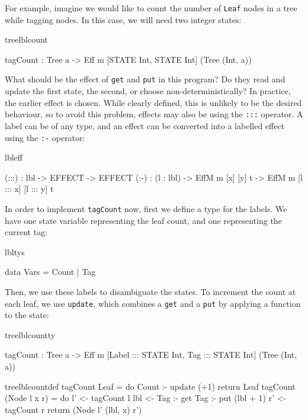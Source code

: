 For example, imagine we would like to count the number of \texttt{Leaf} nodes
in a tree while tagging nodes.  In this case, we will need two integer states:

\begin{SaveVerbatim}{treelblcount}

tagCount : Tree a -> 
     Eff m [STATE Int, STATE Int] (Tree (Int, a))

\end{SaveVerbatim}

\noindent
What should be the effect of \texttt{get} and \texttt{put} in this program?
Do they read and update the first state, the second, or choose
non-deterministically? 
%
In practice, the earlier effect is chosen. While clearly defined, this is
unlikely to be the desired behaviour, so 
to avoid this problem, effects may also be  using the
\texttt{:::} operator.  A label can be of any type, and an
effect can be converted into a labelled effect using the \texttt{:-}
operator:

\begin{SaveVerbatim}{lbleff}

(:::) : lbl -> EFFECT -> EFFECT
(:-)  : (l : lbl) -> EffM m [x] [y] t -> 
                     EffM m [l ::: x] [l ::: y] t

\end{SaveVerbatim}

\noindent
In order to implement \texttt{tagCount} now, first we define a type for the
labels. We have one state variable representing the leaf count, and one
representing the current tag:

\begin{SaveVerbatim}{lbltys}

data Vars = Count | Tag

\end{SaveVerbatim}

\noindent
Then, we use these labels to disambiguate the states. To increment the count
at each leaf, we use \texttt{update}, which combines a \texttt{get} and a
\texttt{put} by applying a function to the state:

\begin{SaveVerbatim}{treelblcountty}

tagCount : Tree a -> Eff m [Label ::: STATE Int, 
                            Tag   ::: STATE Int] 
                              (Tree (Int, a))
\end{SaveVerbatim}
\begin{SaveVerbatim}{treelblcountdef}
tagCount Leaf
     = do Count :- update (+1)
          return Leaf
tagCount (Node l x r) 
     = do l' <- tagCount l
          lbl <- Tag :- get
          Tag :- put (lbl + 1)
          r' <- tagCount r
          return (Node l' (lbl, x) r')

\end{SaveVerbatim}


